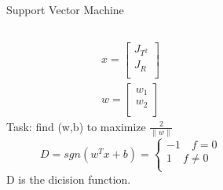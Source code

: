 \documentclass[10pt]{beamer}
\newcommand{\norm}[1]{\left\lVert#1\right\rVert}
\begin{document}
\begin{frame}{Support Vector Machine}
\begin{columns}
        \begin{column}{0.5\textwidth}
           \begin{equation} \nonumber
           \begin{aligned}
               x = \begin{bmatrix}
                   J_{T^2} \\
                   J_R   \\
                   \end{bmatrix} \\
                   w = \begin{bmatrix}
                        w_1 \\
                        w_2 \\
                       \end{bmatrix}
           \end{aligned}
           \end{equation}
           Task: find (w,b) to maximize $\frac{2}{\norm{w}}$
           \begin{equation} \nonumber
           D = sgn(w^Tx+b) = 
           \left\{  \begin{aligned} -1 \quad f = 0  \\
                                     1 \quad f \neq 0  \\   
                    \end{aligned}   
           \right.
           \end{equation}
           D is the dicision function.
        \end{column}
        \begin{column}{0.5\textwidth}  %
            \begin{figure}[!htb] 
                \centering 
\end{figure}
\end{column}
\end{columns}
\end{frame}
\end{document}
